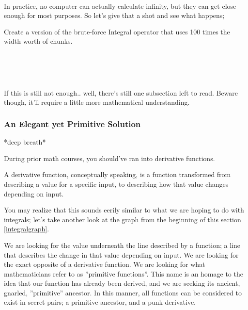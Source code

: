 \paragraph{} In practice, no computer can actually calculate infinity, but they can get close enough for most purposes. So let's give that a shot and see what happens;
\begin{exercise}
Create a version of the brute-force Integral operator that uses 100 times the width worth of chunks.

\\
\\
\\
\end{exercise}

 If this is still not enough.. well, there's still one subsection left to read. Beware though, it'll require a little more mathematical understanding.

\subsubsection{An Elegant yet Primitive Solution}
*deep breath*

During prior math courses, you should've ran into derivative functions.

A derivative function, conceptually speaking, is a function transformed from describing a value for a specific input, to describing how that value changes depending on input.

You may realize that this sounds eerily similar to what we are hoping to do with integrals; let's take another look at the graph from the beginning of this section \ref{integralgraph}.


We are looking for the value underneath the line described by a function; a line that describes the change in that value depending on input. We are looking for the exact opposite of a derivative function. We are looking for what mathematicians refer to as ''primitive functions''. This name is an homage to the idea that our function has already been derived, and we are seeking its ancient, gnarled, ''primitive'' ancestor. In this manner, all functions can be considered to exist in secret pairs; a primitive ancestor, and a punk derivative.

